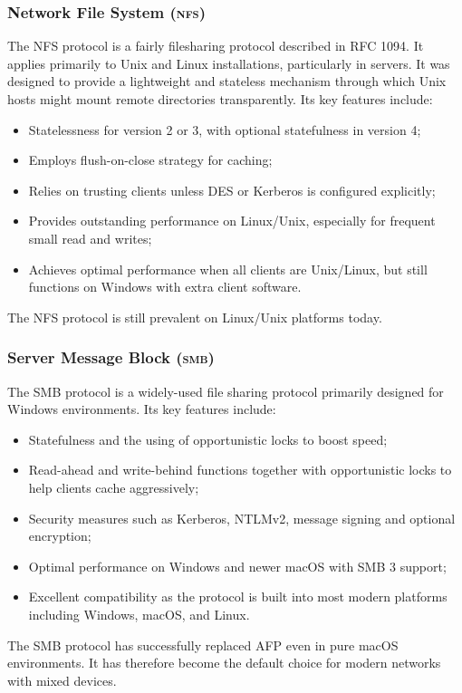 \subsubsection{Network File System (\textsc{nfs})}

The NFS protocol is a fairly filesharing protocol described in RFC
1094\cite{NFSNetworkFile1989,eriksenCOMPARISONNFSSAMBA}. It applies primarily to Unix and Linux installations, particularly in servers. It was designed to provide a lightweight and stateless mechanism through which Unix hosts might mount remote directories transparently. Its key features include:
\begin{itemize}[nosep]
      \item Statelessness for version 2 or 3, with optional statefulness in
            version 4;
      \item Employs flush-on-close strategy for caching;
      \item Relies on trusting clients unless DES or Kerberos is configured
            explicitly;
      \item Provides outstanding performance on Linux/Unix, especially for
            frequent small read and writes;
      \item Achieves optimal performance when all clients are Unix/Linux, but
            still functions on Windows with extra client software.
\end{itemize}
The NFS protocol is still prevalent on Linux/Unix platforms today.
\subsubsection{Server Message Block (\textsc{smb})}

The SMB protocol is a widely-used file sharing protocol primarily designed for
Windows environments. Its key features include\cite{eriksenCOMPARISONNFSSAMBA}:
\begin{itemize}[nosep]
      \item Statefulness and the using of opportunistic locks to boost speed;
      \item Read-ahead and write-behind functions together with opportunistic
            locks to help clients cache aggressively;
      \item Security measures such as Kerberos, NTLMv2, message signing and
            optional encryption;
      \item Optimal performance on Windows and newer macOS with SMB 3 support;
      \item Excellent compatibility as the protocol is built into most modern
            platforms including Windows, macOS, and Linux.
\end{itemize}
The SMB protocol has successfully replaced AFP even in pure macOS environments.
It has therefore become the default choice for modern networks with mixed devices.
